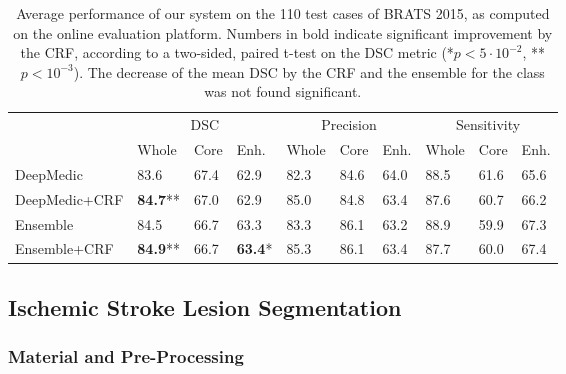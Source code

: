 \begin{table}[!h]
\centering
\scriptsize
\caption{Average performance of our system on the 110 test cases of BRATS 2015, as computed on the online evaluation platform. Numbers in bold indicate significant improvement by the CRF, according to a two-sided, paired t-test on the DSC metric (*$p<5\cdot 10^{-2}$, **$p<10^{-3}$). The decrease of the mean DSC by the CRF and the ensemble for the  class was not found significant.}
\label{table:onlineEvalBrats2015Testing}
\begin{tabular}{@{}llllllllll@{}}
\toprule
              & \multicolumn{3}{c}{DSC}  & \multicolumn{3}{c}{Precision} & \multicolumn{3}{c}{Sensitivity} \\ \cmidrule(l){2-10} 
              & Whole 			& Core & Enh. 			& Whole   & Core   & Enh.	& Whole    & Core   & Enh.   \\ \midrule

DeepMedic     & 83.6  			& 67.4 & 62.9      		& 82.3    & 84.6   & 64.0    & 88.5     & 61.6   & 65.6      \\
DeepMedic+CRF & \textbf{84.7}** 	& 67.0 & 62.9      		& 85.0    & 84.8   & 63.4    & 87.6     & 60.7   & 66.2      \\
Ensemble      & 84.5  			& 66.7 & 63.3      		& 83.3    & 86.1   & 63.2    & 88.9     & 59.9   & 67.3      \\
Ensemble+CRF  & \textbf{84.9}** 	& 66.7 & \textbf{63.4}* 	& 85.3    & 86.1   & 63.4    & 87.7     & 60.0   & 67.4		\\
\bottomrule
\end{tabular}
\end{table}





\subsection{Ischemic Stroke Lesion Segmentation}
\label{subsec:evalIsles}

\subsubsection{Material and Pre-Processing}

